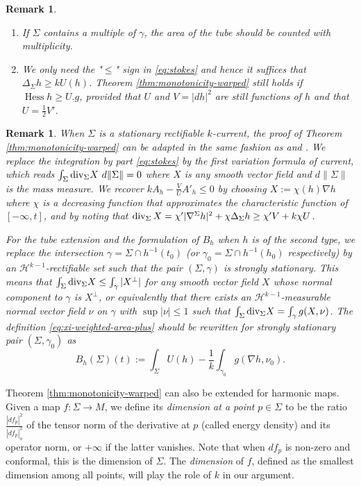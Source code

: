 \documentclass[11pt]{article}
\newtheorem{remark}[theorem]{Remark}
\newcommand{\dive}{\mathop{\rm div}\nolimits}
\DeclareMathOperator{\hess}{Hess}
\begin{document}
\begin{remark}
\label{rem:monotonicity-warped}
\begin{enumerate}
\item If \(\Sigma\) contains a multiple of \(\gamma\), the area of the tube should be counted with multiplicity.
\item We only need the "\(\leq\)" sign in \eqref{eq:stokes} and hence it suffices that \(\Delta_\Sigma h \geq k U(h)\). Theorem \ref{thm:monotonicity-warped}
still holds if \(\hess h\geq
   U.g\), provided that \(U\) and \(V = |d h|^2\) are still
functions of \(h\) and that \(U = \frac{1}{2}V'\).
\end{enumerate}
\end{remark}

\begin{remark}
\label{rem:monotonicity-current}
When \(\Sigma\) is a stationary rectifiable \(k\)-current, the proof of Theorem
   \ref{thm:monotonicity-warped} can be adapted in the same fashion as
   \cite{Anderson82_CompleteMinimalVarieties} and  \cite{Ekholm.etal02_EmbeddednessMinimalSurfaces}. We replace the integration by part \eqref{eq:stokes}
   by the first variation formula of current, which reads \(\int_\Sigma
   {\rm div}_\Sigma X\ d\|\Sigma\| = 0\) where \(X\) is any smooth vector field and
   \(d\|\Sigma\|\) is the mass measure. We recover \(k A_h - \frac{V}{U}A'_h \leq 0\)
   by choosing  \(X:= \chi(h)\nabla h\) where \(\chi\) is a decreasing function that approximates the characteristic
   function of \([-\infty, t]\), and by noting that \(\dive_\Sigma X =   \chi' |\nabla^\Sigma h|^2 + \chi\Delta_\Sigma h \geq \chi' V + k \chi U\).

For the tube extension and the formulation of \(B_h\) when \(h\) is of the second
   type, we replace the intersection \(\gamma =\Sigma \cap h^{-1}(t_0)\) (or \(\gamma_{0} = \Sigma\cap h^{-1}(h_0)\) respectively) by an
   \(\mathcal{H}^{k-1}\)-rectifiable set such that the pair  \((\Sigma, \gamma)\) is \emph{strongly stationary}. This means that 
\(\int_\Sigma {\rm div}_\Sigma X
   \leq \int_{\gamma} |X^\perp|\) 
for any smooth vector field \(X\) whose normal
   component to \(\gamma\) is \(X^\perp\), or equivalently that there exists an \(\mathcal{H}^{k-1}\)-measurable normal vector field \(\nu\) on \(\gamma\) with \(\sup|\nu| \leq 1\) such that \(\int_\Sigma {\rm div}_\Sigma X = \int_\gamma g(X,\nu)\). 
The definition \eqref{eq:xi-weighted-area-plus} should be rewritten for strongly stationary
   pair \((\Sigma,\gamma_0)\) as
\[ B_h(\Sigma)(t):= \int_{\Sigma}U(h) - \frac{1}{k}\int_{\gamma_0}g(\nabla h,\nu_0).
\]
\end{remark}
Theorem \ref{thm:monotonicity-warped} can also be extended for harmonic maps. Given a map \(f:\Sigma \longrightarrow M\), we
define its \emph{dimension at a point} \(p\in \Sigma\) to be the ratio \(\frac{|df_p|^2}{|df_p|_o^2}\)
of the tensor norm of the derivative at \(p\) (called energy
density) and its operator norm, or \(+\infty\) if the latter vanishes. Note that when \(df_p\) is non-zero and conformal, 
this is the dimension of \(\Sigma\). The \emph{dimension} of \(f\), defined as the smallest
dimension among all points, will play the role of \(k\) in our argument.
\end{document}
